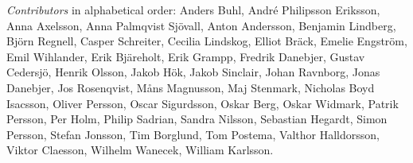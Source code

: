 \emph{Contributors} in alphabetical order:
Anders Buhl,
André Philipsson Eriksson,
Anna Axelsson,
Anna Palmqvist Sjövall,
Anton Andersson,
Benjamin Lindberg,
Björn Regnell,
Casper Schreiter,
Cecilia Lindskog,
Elliot Bräck,
Emelie Engström,
Emil Wihlander,
Erik Bjäreholt,
Erik Grampp,
Fredrik Danebjer,
Gustav Cedersjö,
Henrik Olsson,
Jakob Hök,
Jakob Sinclair,
Johan Ravnborg,
Jonas Danebjer,
Jos Rosenqvist,
Måns Magnusson,
Maj Stenmark,
Nicholas Boyd Isacsson,
Oliver Persson,
Oscar Sigurdsson,
Oskar Berg,
Oskar Widmark,
Patrik Persson,
Per Holm,
Philip Sadrian,
Sandra Nilsson,
Sebastian Hegardt,
Simon Persson,
Stefan Jonsson,
Tim Borglund,
Tom Postema,
Valthor Halldorsson,
Viktor Claesson,
Wilhelm Wanecek,
William Karlsson.
